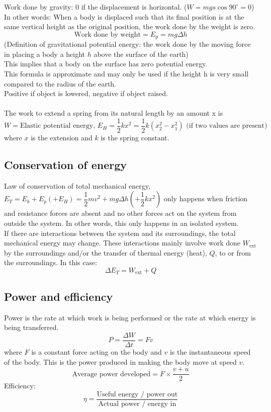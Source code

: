Work done by gravity: 0 if the displacement is horizontal. ($W=mgs\cos 90^\circ=0$)\\
In other words: When a body is displaced such that its final position is at the same vertical height as the original position, the work done by the weight is zero.
\[\text{Work done by weight}=E_\text{p}=mg\Delta h\]
(Definition of gravitational potential energy: the work done by the moving force in placing a body a height $h$ above the surface of the earth)\\
This implies that a body on the surface has zero potential energy.\\
This formula is approximate and may only be used if the height h is very small compared to the radius of the earth.\\
Positive if object is lowered, negative if object raised.\\\\
The work to extend a spring from its natural length by an amount x is
\[W=\text{Elastic potential energy, } E_H=\dfrac{1}{2}kx^2=\dfrac{1}{2}k(x_2^2-x_1^2) \text{ (if two values are present)}\]
where $x$ is the extension and $k$ is the spring constant.
\subsection{Conservation of energy}
Law of conservation of total mechanical energy, $E_T=E_k+E_p(+E_H)=\dfrac{1}{2}mv^2+mg\Delta h\left(+\dfrac{1}{2}kx^2\right)$ only happens when friction and resistance forces are absent and no other forces act on the system from outside the system. In other words, this only happens in an isolated system.\\
If there are interactions between the system and its surroundings, the total mechanical energy may change. These interactions mainly involve work done $W_\text{ext}$ by the surroundings and/or the transfer of thermal energy (heat), $Q$, to or from the surroundings. In this case:
\[\Delta E_T=W_\text{ext} + Q\]
\subsection{Power and efficiency}
Power is the rate at which work is being performed or the rate at which energy is being transferred.
\[P=\dfrac{\Delta W}{\Delta t}=Fv\]
where $F$ is a constant force acting on the body and $v$ is the instantaneous speed of the body. This is the power produced in making the body move at speed $v$.
\[\text{Average power developed}=\overline{F}\times\dfrac{v+u}{2}\]
Efficiency:
\[\eta=\dfrac{\text{Useful energy / power out}}{\text{Actual power / energy in}}\]
